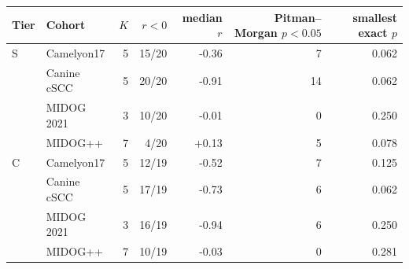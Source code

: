 \begin{tabular*}{\tblwidth}{@{\extracolsep{\fill}}llrrrrr@{}}
\toprule
Tier & Cohort & $K$ & $r<0$ & median $r$ & Pitman--Morgan $p<0.05$ & smallest exact $p$ \\
\midrule
S & Camelyon17 & 5 & 15/20 & -0.36 & 7 & 0.062 \\
 & Canine cSCC & 5 & 20/20 & -0.91 & 14 & 0.062 \\
 & MIDOG 2021 & 3 & 10/20 & -0.01 & 0 & 0.250 \\
 & MIDOG++ & 7 & 4/20 & +0.13 & 5 & 0.078 \\
\addlinespace[3pt]
C & Camelyon17 & 5 & 12/19 & -0.52 & 7 & 0.125 \\
 & Canine cSCC & 5 & 17/19 & -0.73 & 6 & 0.062 \\
 & MIDOG 2021 & 3 & 16/19 & -0.94 & 6 & 0.250 \\
 & MIDOG++ & 7 & 10/19 & -0.03 & 0 & 0.281 \\
\bottomrule
\end{tabular*}
